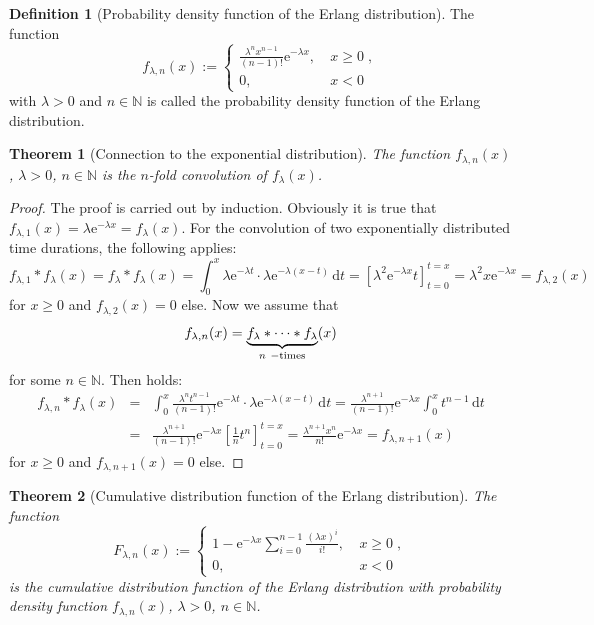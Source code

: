 \documentclass[a4paper,11pt,oneside]{article}
\newtheorem{theorem}{Theorem}
\theoremstyle{definition}
\newtheorem{definition}{Definition}
\begin{document}
\begin{definition}[Probability density function of the Erlang distribution]
The function
$$
f_{\lambda,n}(x):=\left\{\begin{matrix}
\frac{\lambda^n x^{n-1}}{(n-1)!} \mathrm{e}^{-\lambda x},&~x\ge0\;,\\
0,&~x<0
\end{matrix}\right.
$$
with $\lambda>0$ and $n\in\mathbb{N}$ is called the probability density function of the Erlang distribution.
\end{definition}

\begin{theorem}[Connection to the exponential distribution]
The function $f_{\lambda,n}(x)$, $\lambda>0$, $n\in\mathbb{N}$ is the $n$-fold convolution of $f_\lambda(x)$.
\end{theorem}

\begin{proof}
The proof is carried out by induction. Obviously it is true that $f_{\lambda,1}(x)=\lambda \mathrm{e}^{-\lambda x}=f_\lambda(x)$. For the convolution of two exponentially distributed time durations, the following applies:
$$
f_{\lambda,1}*f_\lambda(x)=
f_\lambda*f_\lambda(x)=
\int_0^x \lambda \mathrm{e}^{-\lambda t}\cdot\lambda \mathrm{e}^{-\lambda(x-t)}\,\mbox{d}t=
\left[\lambda^2\mathrm{e}^{-\lambda x}t\right]_{t=0}^{t=x}=
\lambda^2x\mathrm{e}^{-\lambda x}=f_{\lambda,2}(x)
$$
for $x\ge0$ and $f_{\lambda,2}(x)=0$ else. Now we assume that
$$
f_{\lambda,n}(x)=\underbrace{f_\lambda*\cdots*f_\lambda}_{n~{\rm-times}}(x)
$$
for some $n\in\mathbb{N}$.
Then holds:
\begin{eqnarray*}
f_{\lambda,n}*f_\lambda(x)&=&
\int_0^x \frac{\lambda^n t^{n-1}}{(n-1)!}\mathrm{e}^{-\lambda t}\cdot\lambda \mathrm{e}^{-\lambda(x-t)}\,\mbox{d}t=
\frac{\lambda^{n+1}}{(n-1)!}\mathrm{e}^{-\lambda x}\int_0^x t^{n-1}\,\mbox{d}t\\&=&
\frac{\lambda^{n+1}}{(n-1)!}\mathrm{e}^{-\lambda x}\left[\frac{1}{n}t^n\right]_{t=0}^{t=x}=
\frac{\lambda^{n+1}x^n}{n!}\mathrm{e}^{-\lambda x}=
f_{\lambda,n+1}(x)
\end{eqnarray*}
for $x\ge0$ and $f_{\lambda,n+1}(x)=0$ else.
\end{proof}

\begin{theorem}[Cumulative distribution function of the Erlang distribution]
The function
$$
F_{\lambda,n}(x):=\left\{\begin{matrix}
1-\mathrm{e}^{-\lambda x}\sum_{i=0}^{n-1}\frac{(\lambda x)^i}{i!},&~x\ge0\;,\\
0,&~x<0
\end{matrix}\right.
$$
is the cumulative distribution function of the Erlang distribution with probability density function $f_{\lambda,n}(x)$, $\lambda>0$, $n\in\mathbb{N}$.
\end{theorem}
\end{document}
